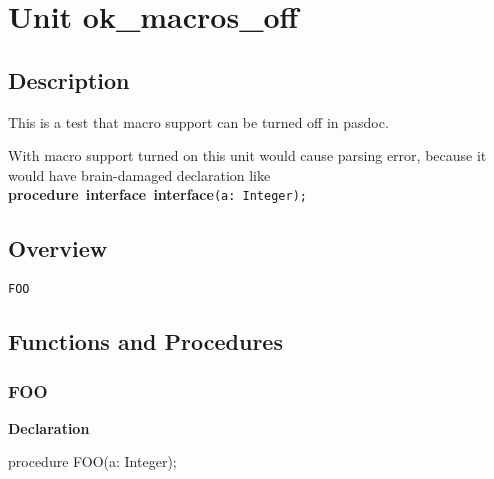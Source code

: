 \documentclass{report}
\newif\ifpdf
\begin{document}
\label{toc}\tableofcontents
\newpage
\newlength{\tmplength}
\chapter{Unit ok{\_}macros{\_}off}
\label{ok_macros_off}
\section{Description}
This is a test that macro support can be turned off in pasdoc.\hfill\vspace*{1ex}



With macro support turned on this unit would cause parsing error, because it would have brain{-}damaged declaration like \texttt{\\\nopagebreak[3]
}\textbf{procedure}\texttt{~}\textbf{interface}\texttt{~}\textbf{interface}\texttt{(a:~Integer);\\
}
\section{Overview}
\begin{description}
\item[\texttt{FOO}]
\end{description}
\section{Functions and Procedures}
\ifpdf
\subsection*{\large{\textbf{FOO}}\normalsize\hspace{1ex}\hrulefill}
\else
\subsection*{FOO}
\fi
\label{ok_macros_off-FOO}
\begin{list}{}{
\setlength{\itemindent}{0cm}
\setlength{\listparindent}{0cm}
\setlength{\leftmargin}{\evensidemargin}
\addtolength{\leftmargin}{\tmplength}
\settowidth{\labelsep}{X}
\addtolength{\leftmargin}{\labelsep}
\setlength{\labelwidth}{\tmplength}
}
\item[\textbf{Declaration}\hfill]
\ifpdf
\begin{flushleft}
\fi
\begin{ttfamily}
procedure FOO(a: Integer);\end{ttfamily}

\ifpdf
\end{flushleft}
\fi

\end{list}
\end{document}
